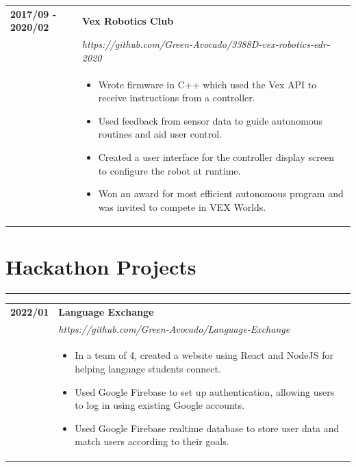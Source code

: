 \documentclass[letterpaper]{article}
\newcommand{\sectcolor}{cyan}
\newcommand{\sect}[1]{\section*{#1}
                        {\color{\sectcolor}
                        \rule{\textwidth}{1pt}
                        \vspace{-1ex}}}
\begin{document}
        \begin{tabular}{p{} p{}}
            \textbf{2017/09 - 2020/02} & \textbf{Vex Robotics Club} \\
            & \emph{https://github.com/Green-Avocado/3388D-vex-robotics-edr-2020} \\
            & \begin{itemize}
                \item Wrote firmware in C++ which used the Vex API to receive instructions from a
                    controller.
                \item Used feedback from sensor data to guide autonomous routines and aid user control.
                \item Created a user interface for the controller display screen to configure the robot at
                    runtime.
                \item Won an award for most efficient autonomous program and was invited to compete in VEX
                    Worlds.
            \end{itemize}
        \end{tabular}

    \sect{Hackathon Projects}

        \begin{tabular}{p{} p{}}
            \textbf{2022/01} & \textbf{Language Exchange} \\
            & \emph{https://github.com/Green-Avocado/Language-Exchange} \\
            & \begin{itemize}
                \item In a team of 4, created a website using React and NodeJS for helping language
                    students connect.
                \item Used Google Firebase to set up authentication, allowing users to log in using
                    existing Google accounts.
                \item Used Google Firebase realtime database to store user data and match users according 
                    to their goals.
            \end{itemize}
        \end{tabular}
\end{document}

